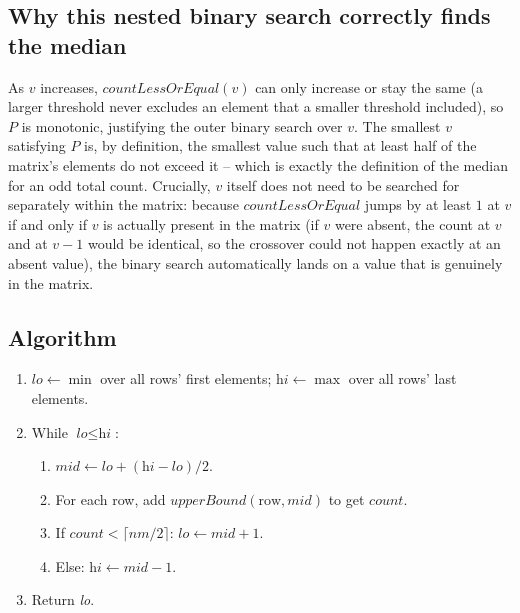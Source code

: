 \subsection*{Why this nested binary search correctly finds the median}

As $v$ increases, $\textit{countLessOrEqual}(v)$ can only increase or stay
the same (a larger threshold never excludes an element that a smaller
threshold included), so $P$ is monotonic, justifying the outer binary
search over $v$. The smallest $v$ satisfying $P$ is, by definition, the
smallest value such that at least half of the matrix's elements do not
exceed it -- which is exactly the definition of the median for an odd
total count. Crucially, $v$ itself does not need to be searched for
separately within the matrix: because $\textit{countLessOrEqual}$ jumps by
at least $1$ at $v$ if and only if $v$ is actually present in the matrix
(if $v$ were absent, the count at $v$ and at $v-1$ would be identical, so
the crossover could not happen exactly at an absent value), the binary
search automatically lands on a value that is genuinely in the matrix.

\subsection*{Algorithm}

\begin{enumerate}
  \item $\textit{lo} \gets \min$ over all rows' first elements;
        $\textit{hi} \gets \max$ over all rows' last elements.
  \item While $\textit{lo} \le \textit{hi}$:
  \begin{enumerate}
    \item $\textit{mid} \gets \textit{lo}+(\textit{hi}-\textit{lo})/2$.
    \item For each row, add $\textit{upperBound}(\text{row},
          \textit{mid})$ to get $\textit{count}$.
    \item If $\textit{count} < \lceil nm/2 \rceil$: $\textit{lo} \gets
          \textit{mid}+1$.
    \item Else: $\textit{hi} \gets \textit{mid}-1$.
  \end{enumerate}
  \item Return \textit{lo}.
\end{enumerate}

